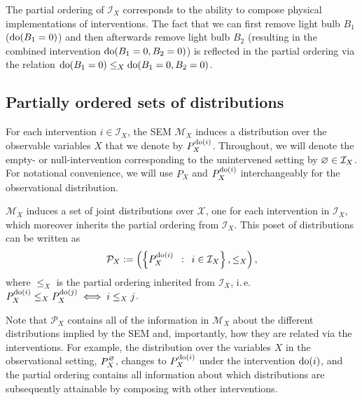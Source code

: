 The partial ordering of $\mathcal{I}_X$ corresponds to the ability to compose physical implementations of interventions. The fact that we can first remove light bulb $B_1$ (${\operatorname{do}(B_1=0)}$) and then afterwards remove light bulb $B_2$ (resulting in the combined intervention ${\operatorname{do}(B_1=0, B_2=0)}$)  is reflected in the partial ordering via the relation ${\operatorname{do}(B_1=0) \leq_X \operatorname{do}(B_1=0,B_2=0)}$.

\subsection{Partially ordered sets of distributions}\label{subsec:partially-ordered-sets-of-dists}

For each intervention $i \in \mathcal{I}_X$, the SEM $\mathcal{M}_X$ induces a distribution over the observable variables $X$ that we denote by $P_X^{\operatorname{do}(i)}$.
Throughout, we will denote the empty- or null-intervention corresponding to the unintervened setting by $\varnothing\in \mathcal{I}_X$.
For notational convenience, we will use $P_X$ and $P_X^{\operatorname{do}(i)}$ interchangeably for the observational distribution.

$\mathcal{M}_X$ induces a set of joint distributions over $\mathcal{X}$, one for each intervention in $\mathcal{I}_X$, which moreover inherits the partial ordering from $\mathcal{I}_X$. 
This poset of distributions can be written as
\[\mathcal{P}_X := \left( \left\{ P_X^{\operatorname{do}(i)} \enspace : \enspace i \in \mathcal{I}_X \right\}, \leq_X \right), \]
where $\leq_X$ is the partial ordering inherited from $\mathcal{I}_X$, i.\,e.\ ${P_X^{\operatorname{do}(i)} \leq_X P_X^{\operatorname{do}(j)} \iff i \leq_X j}$.%

Note that $\mathcal{P}_X$ contains all of the information in $\mathcal{M}_X$ about the different distributions implied by the SEM and, importantly, how they are related via the interventions.
For example, the distribution over the variables $X$ in the observational setting, $P_X^\varnothing$, changes to $P_X^{\operatorname{do}(i)}$ under the intervention ${\operatorname{do}(i)}$, and the partial ordering contains all information about which distributions are subsequently attainable by composing with other interventions.



